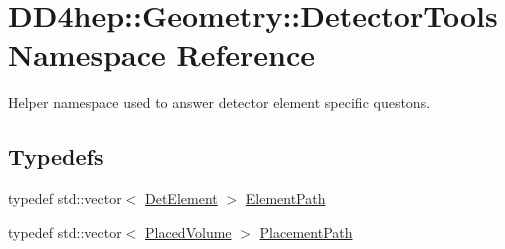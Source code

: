 \hypertarget{namespace_d_d4hep_1_1_geometry_1_1_detector_tools}{}\section{D\+D4hep\+:\+:Geometry\+:\+:Detector\+Tools Namespace Reference}
\label{namespace_d_d4hep_1_1_geometry_1_1_detector_tools}


Helper namespace used to answer detector element specific questons.  


\subsection*{Typedefs}
\begin{DoxyCompactItemize}
\item 
typedef std\+::vector$<$ \hyperlink{class_d_d4hep_1_1_geometry_1_1_det_element}{Det\+Element} $>$ \hyperlink{namespace_d_d4hep_1_1_geometry_1_1_detector_tools_a57c8f37a975258fd84676a69e74c56ab}{Element\+Path}
\item 
typedef std\+::vector$<$ \hyperlink{class_d_d4hep_1_1_geometry_1_1_placed_volume}{Placed\+Volume} $>$ \hyperlink{namespace_d_d4hep_1_1_geometry_1_1_detector_tools_a6cc33285199e04dd336a33e6e62925e6}{Placement\+Path}
\end{DoxyCompactItemize}
